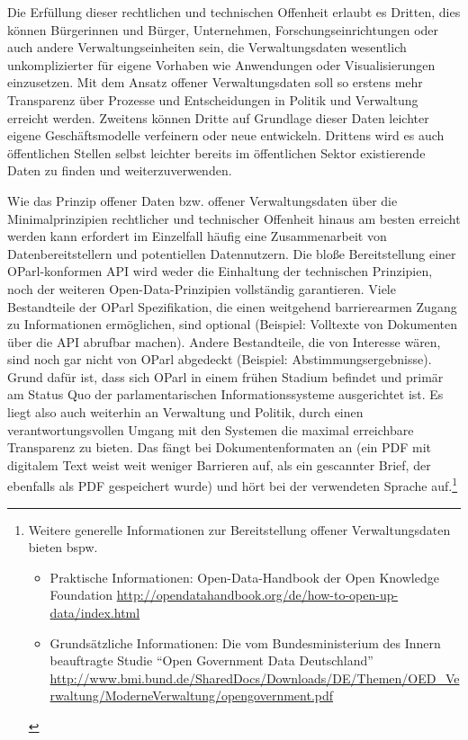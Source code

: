 \documentclass[,a4paper]{article}
\begin{document}
Die Erfüllung dieser rechtlichen und technischen Offenheit erlaubt es
Dritten, dies können Bürgerinnen und Bürger, Unternehmen,
Forschungseinrichtungen oder auch andere Verwaltungseinheiten sein, die
Verwaltungsdaten wesentlich unkomplizierter für eigene Vorhaben wie
Anwendungen oder Visualisierungen einzusetzen. Mit dem Ansatz offener
Verwaltungsdaten soll so erstens mehr Transparenz über Prozesse und
Entscheidungen in Politik und Verwaltung erreicht werden. Zweitens
können Dritte auf Grundlage dieser Daten leichter eigene
Geschäftsmodelle verfeinern oder neue entwickeln. Drittens wird es auch
öffentlichen Stellen selbst leichter bereits im öffentlichen Sektor
existierende Daten zu finden und weiterzuverwenden.

Wie das Prinzip offener Daten bzw. offener Verwaltungsdaten über die
Minimalprinzipien rechtlicher und technischer Offenheit hinaus am besten
erreicht werden kann erfordert im Einzelfall häufig eine Zusammenarbeit
von Datenbereitstellern und potentiellen Datennutzern. Die bloße
Bereitstellung einer OParl-konformen API wird weder die Einhaltung der
technischen Prinzipien, noch der weiteren Open-Data-Prinzipien
vollständig garantieren. Viele Bestandteile der OParl Spezifikation, die
einen weitgehend barrierearmen Zugang zu Informationen ermöglichen, sind
optional (Beispiel: Volltexte von Dokumenten über die API abrufbar
machen). Andere Bestandteile, die von Interesse wären, sind noch gar
nicht von OParl abgedeckt (Beispiel: Abstimmungsergebnisse). Grund dafür
ist, dass sich OParl in einem frühen Stadium befindet und primär am
Status Quo der parlamentarischen Informationssysteme ausgerichtet ist.
Es liegt also auch weiterhin an Verwaltung und Politik, durch einen
verantwortungsvollen Umgang mit den Systemen die maximal erreichbare
Transparenz zu bieten. Das fängt bei Dokumentenformaten an (ein PDF mit
digitalem Text weist weit weniger Barrieren auf, als ein gescannter
Brief, der ebenfalls als PDF gespeichert wurde) und hört bei der
verwendeten Sprache auf.\footnote{Weitere generelle Informationen zur
  Bereitstellung offener Verwaltungsdaten bieten bspw.

  \begin{itemize}
  \itemsep1pt\parskip0pt
  \item
    Praktische Informationen: Open-Data-Handbook der Open Knowledge
    Foundation
    \url{http://opendatahandbook.org/de/how-to-open-up-data/index.html}
  \item
    Grundsätzliche Informationen: Die vom Bundesministerium des Innern
    beauftragte Studie ``Open Government Data Deutschland''
    \url{http://www.bmi.bund.de/SharedDocs/Downloads/DE/Themen/OED_Verwaltung/ModerneVerwaltung/opengovernment.pdf}
  \end{itemize}}
\end{document}

